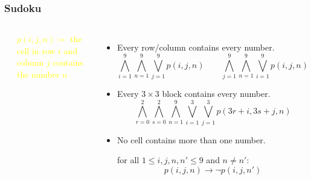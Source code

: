\documentclass[UTF8,aspectratio=43,11pt,colorlinks,compress,openany]{beamer}%
\begin{document}
\begin{frame}\frametitle{Sudoku}
\begin{columns}
\begin{center}
\end{center}
\centering\textcolor{yellow}{$p(i,j,n)\coloneqq $ the cell in row $i$ and column $j$ contains the number $n$}
\begin{itemize}
				\item Every row/column contains every number.
				\[\bigwedge\limits_{i=1}^9\bigwedge\limits_{n=1}^9\bigvee\limits_{j=1}^9 p(i,j,n)\qquad\bigwedge\limits_{j=1}^9\bigwedge\limits_{n=1}^9\bigvee\limits_{i=1}^9 p(i,j,n)\]
				\item Every $3\times3$ block contains every number.
				\[\bigwedge\limits_{r=0}^2\bigwedge\limits_{s=0}^2\bigwedge\limits_{n=1}^9\bigvee\limits_{i=1}^3\bigvee\limits_{j=1}^3 p(3r+i,3s+j,n)\]
				\item No cell contains more than one number.
				
				for all $1\leq i,j,n,n'\leq 9$ and $n\neq n'$: \[p(i,j,n)\to\neg p(i,j,n')\]
\end{itemize}
\end{columns}
\end{frame}
\end{document}
